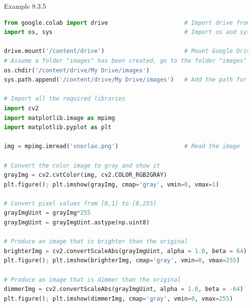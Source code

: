 \documentclass{book}
\begin{document}
\begin{egBox}{Example 8.3.5}{}
    \begin{lstlisting}[language=Python, basicstyle=\ttfamily\small, keywordstyle=\color{blue}, commentstyle=\color{forestgreen}, stringstyle=\color{red}, showstringspaces=false]
from google.colab import drive                      # Import drive from google.colab package
import os, sys                                      # Import os and sys modules

drive.mount('/content/drive')                       # Mount Google Drive
# Assume a folder "images" has been created, go to the folder "images"
os.chdir('/content/drive/My Drive/images')
sys.path.append('/content/drive/My Drive/images')   # Add the path for interpreter to search

# Import all the required libraries
import cv2
import matplotlib.image as mpimg
import matplotlib.pyplot as plt

img = mpimg.imread('snorlax.png')                   # Read the image

# Convert the color image to gray and show it
grayImg = cv2.cvtColor(img, cv2.COLOR_RGB2GRAY)
plt.figure(); plt.imshow(grayImg, cmap='gray', vmin=0, vmax=1)

# Convert pixel values from [0,1] to [0,255]
grayImgUint = grayImg*255
grayImgUint = grayImgUint.astype(np.uint8)

# Produce an image that is brighter than the original
brighterImg = cv2.convertScaleAbs(grayImgUint, alpha = 1.0, beta = 64)
plt.figure(); plt.imshow(brighterImg, cmap='gray', vmin=0, vmax=255)

# Produce an image that is dimmer than the original
dimmerImg = cv2.convertScaleAbs(grayImgUint, alpha = 1.0, beta = -64)
plt.figure(); plt.imshow(dimmerImg, cmap='gray', vmin=0, vmax=255)


\end{lstlisting}
\end{egBox}
\end{document}
